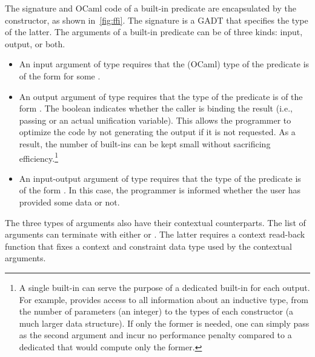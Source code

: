 \documentclass{these-ISSS}
\begin{document}
The signature and OCaml code of a built-in predicate are encapsulated by the
 constructor, as shown in~\cref{fig:ffi}. The signature is a GADT that
specifies the type of the latter. The arguments of a built-in predicate
can be of three kinds: input,
output, or both.
\begin{itemize}
\item
An input argument of type  requires that the (OCaml) type of the predicate
 is of the form  for some .\\
\item
An output argument of type  requires that the type of the predicate
 is of the form . The boolean indicates
whether the caller is binding the result (i.e., passing \elpi{_} or an actual unification variable). This allows
the programmer to optimize the code by not generating the output if it is not
requested. As a result, the number of built-ins can be kept small without
sacrificing efficiency.\footnote{A single built-in can serve the purpose of a
dedicated built-in for each output. For example,  provides
access to all information about an inductive type, from the number of
parameters (an integer) to the types of each constructor (a much larger data
structure). If only the former is needed, one can simply pass \elpi{_} as the
second argument and incur no performance penalty compared to a dedicated
 that would compute only the former.}\\
\item
An input-output argument of type  requires that the type of the
predicate  is of the form . In this
case, the programmer is informed whether the user has provided some data or
not.
\end{itemize}

\noindent
The three types of arguments also have their contextual counterparts. The list
of arguments can terminate with either  or . The
latter requires a context read-back function that fixes a context and
constraint data type used by the contextual arguments.
\end{document}
